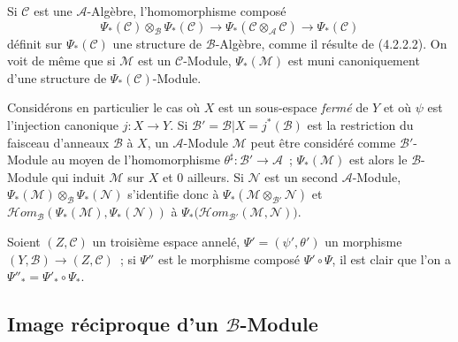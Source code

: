 \begin{env}[4.2.4]
\label{0.4.2.4-fr}
Si $\mathcal{C}$ est une $\mathcal{A}$-Algèbre, l'homomorphisme composé
\[
  \Psi_*(\mathcal{C})\otimes_{\mathcal{B}}\Psi_*(\mathcal{C})
  \longrightarrow
  \Psi_*(\mathcal{C}\otimes_{\mathcal{A}}\mathcal{C})
  \longrightarrow
  \Psi_*(\mathcal{C})
\]
définit sur $\Psi_*(\mathcal{C})$ une structure de $\mathcal{B}$-Algèbre,
comme il résulte de (4.2.2.2). On voit de même que si $\mathcal{M}$ est un
$\mathcal{C}$-Module, $\Psi_*(\mathcal{M})$ est muni canoniquement d'une
structure de $\Psi_*(\mathcal{C})$-Module.
\end{env}

\begin{env}[4.2.5]
\label{0.4.2.5-fr}
Considérons en particulier le cas où $X$ est un sous-espace \emph{fermé} de
$Y$ et où $\psi$ est l'injection canonique $j:X\to Y$. Si
$\mathcal{B}'=\mathcal{B}|X=j^*(\mathcal{B})$ est la restriction du faisceau
d'anneaux $\mathcal{B}$ à $X$, un $\mathcal{A}$-Module $\mathcal{M}$ peut
être considéré comme $\mathcal{B}'$-Module au moyen de l'homomorphisme
$\theta^\sharp:\mathcal{B}'\to\mathcal{A}$~; $\Psi_*(\mathcal{M})$ est alors
le $\mathcal{B}$-Module qui induit $\mathcal{M}$ sur $X$ et $0$ ailleurs. Si
$\mathcal{N}$ est un second $\mathcal{A}$-Module,
$\Psi_*(\mathcal{M})\otimes_{\mathcal{B}}\Psi_*(\mathcal{N})$ s'identifie
donc à $\Psi_*(\mathcal{M}\otimes_{\mathcal{B}'}\mathcal{N})$ et
$\mathcal{H}\!om_{\mathcal{B}}(\Psi_*(\mathcal{M}),\Psi_*(\mathcal{N}))$
à
$\Psi_*\bigl(\mathcal{H}\!om_{\mathcal{B}'}(\mathcal{M},\mathcal{N})\bigr)$.
\end{env}

\begin{env}[4.2.6]
\label{0.4.2.6-fr}
Soient $(Z,\mathcal{C})$ un troisième espace annelé,
$\Psi'=(\psi',\theta')$ un morphisme
$(Y,\mathcal{B})\to(Z,\mathcal{C})$~; si $\Psi''$ est le morphisme composé
$\Psi'\circ\Psi$, il est clair que l'on a
$\Psi''_*=\Psi'_*\circ\Psi_*$.
\end{env}

\subsection{Image réciproque d'un $\mathcal{B}$-Module}
\label{subsection:0.4.3-fr}

